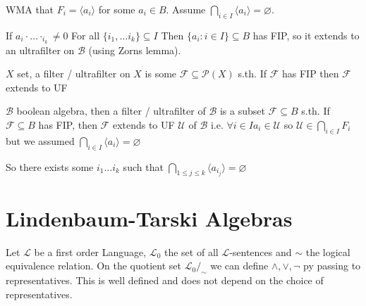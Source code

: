 {\begin{enumerate}
        WMA that $F_i = \langle a_i \rangle$ for some $a_i\in B$.
        Assume $\bigcap_{i\in I}\langle a_i\rangle = \varnothing$.
       
        If $a_i\cdot \dots \cdot_{i_k} \neq 0$ For all $\{i_1,\dots i_k\}\subseteq I$ Then $\{a_i : i\in I\}\subseteq B$ has FIP, so it extends to an ultrafilter on $\mathcal{B}$ (using Zorns lemma).
        \begin{multicols}{2}
            $X$ set, a filter / ultrafilter on $X$ is some $\mathcal{F}\subseteq \mathcal{P}(X)$ s.th.
            If $\mathcal{F}$ has FIP then $\mathcal{F}$ extends to UF
        
            $\mathcal{B}$ boolean algebra, then a filter / ultrafilter of $\mathcal{B}$ is a subset $\mathcal{F}\subseteq B$ s.th.
            If $\mathcal{F}\subseteq B$ has FIP, then $\mathcal{F}$ extends to UF $\mathcal{U}$ of $\mathcal{B}$
            i.e. $\forall i\in I a_i\in \mathcal{U}$ so $\mathcal{U}\in \bigcap_{i\in I}F_i $ but we assumed $\bigcap_{i\in I}\langle a_i\rangle = \varnothing$
        \end{multicols}
        So there exists some $i_1\dots i_k$ such that $\bigcap_{1\leq j\leq k}\langle a_{i_j}\rangle =\varnothing$
    \end{enumerate}
}


\section{Lindenbaum-Tarski Algebras}
Let $\mathcal{L}$ be a first order Language, $\mathcal{L}_0$ the set of all $\mathcal{L}$-sentences and $\sim$ the logical equivalence relation.
On the quotient set $\mathcal{L}_0/_\sim$ we can define $\land,\lor,\lnot$ py passing to representatives. This is well defined and does not depend on the choice of representatives.

